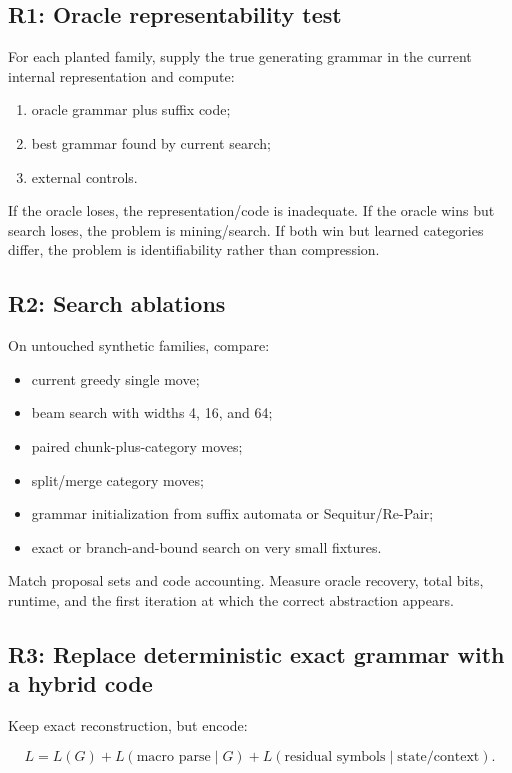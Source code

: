 \documentclass[10pt]{article}
\begin{document}
\subsection*{R1: Oracle representability test}

For each planted family, supply the true generating grammar in the current
internal representation and compute:

\begin{enumerate}
\item oracle grammar plus suffix code;
\item best grammar found by current search;
\item external controls.
\end{enumerate}

If the oracle loses, the representation/code is inadequate. If the oracle wins
but search loses, the problem is mining/search. If both win but learned
categories differ, the problem is identifiability rather than compression.

\subsection*{R2: Search ablations}

On untouched synthetic families, compare:

\begin{itemize}
\item current greedy single move;
\item beam search with widths 4, 16, and 64;
\item paired chunk-plus-category moves;
\item split/merge category moves;
\item grammar initialization from suffix automata or Sequitur/Re-Pair;
\item exact or branch-and-bound search on very small fixtures.
\end{itemize}

Match proposal sets and code accounting. Measure oracle recovery, total bits,
runtime, and the first iteration at which the correct abstraction appears.

\subsection*{R3: Replace deterministic exact grammar with a hybrid code}

Keep exact reconstruction, but encode:

\[
L = L(G) + L(\text{macro parse}\mid G)
    + L(\text{residual symbols}\mid \text{state/context}).
\]
\end{document}
